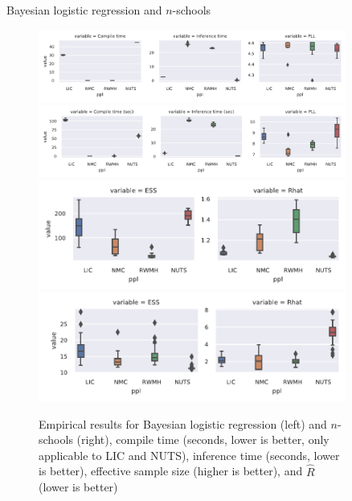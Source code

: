 \documentclass[final]{beamer}
\newlength{\sepwid}
\newlength{\onecolwid}
\newlength{\twocolwid}
\begin{document}
\begin{frame}[t,containsverbatim]
\begin{columns}[t]
\begin{column}{\twocolwid}
\begin{block}{Bayesian logistic regression and $n$-schools}
        \begin{figure}
          \includegraphics[width=0.475\linewidth,trim=17 0 205 0,clip]{../Figures/blr_pll_type1.pdf}
          \includegraphics[width=0.485\linewidth,trim=17 0 205 0,clip]{../Figures/nschools_pll_type1.pdf}
          \includegraphics[width=0.475\linewidth,trim=17 0 0 0,clip]{../Figures/blr_ess_rhat_type1.pdf}
          \includegraphics[width=0.485\linewidth,trim=27 0 0 0,clip]{../Figures/nschools_ess_rhat_type1.pdf}
          \caption{Empirical results for Bayesian logistic regression (left) and $n$-schools (right),
            compile time (seconds, lower is better, only applicable to LIC and NUTS), inference time (seconds, lower is better), effective sample size
            (higher is better), and $\hat{R}$ \cite{brooks1998general} (lower is better)}
        \end{figure}
      \end{block}



    \end{column} %

    \begin{column}{\sepwid}\end{column} %

    \begin{column}{\onecolwid} %



\end{column}
\end{columns}
\end{frame}
\end{document}
